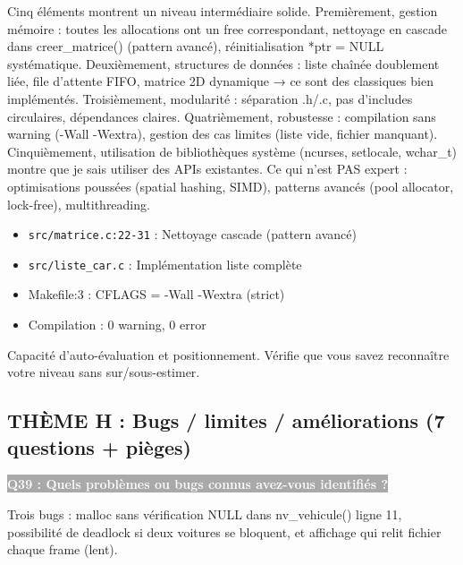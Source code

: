 \documentclass[12pt,a4paper]{article}
\newcommand{\question}[1]{%
    \vspace{0.5cm}
    \noindent\colorbox{darkgray}{\textcolor{white}{\textbf{#1}}}
    \vspace{0.3cm}
}
\begin{document}
\begin{reponse_longue}
Cinq éléments montrent un niveau intermédiaire solide. Premièrement, gestion mémoire : toutes les allocations ont un free correspondant, nettoyage en cascade dans creer\_matrice() (pattern avancé), réinitialisation *ptr = NULL systématique. Deuxièmement, structures de données : liste chaînée doublement liée, file d'attente FIFO, matrice 2D dynamique → ce sont des classiques bien implémentés. Troisièmement, modularité : séparation .h/.c, pas d'includes circulaires, dépendances claires. Quatrièmement, robustesse : compilation sans warning (-Wall -Wextra), gestion des cas limites (liste vide, fichier manquant). Cinquièmement, utilisation de bibliothèques système (ncurses, setlocale, wchar\_t) montre que je sais utiliser des APIs existantes. Ce qui n'est PAS expert : optimisations poussées (spatial hashing, SIMD), patterns avancés (pool allocator, lock-free), multithreading.
\end{reponse_longue}

\begin{reference_code}
\begin{itemize}
    \item \texttt{src/matrice.c:22-31} : Nettoyage cascade (pattern avancé)
    \item \texttt{src/liste\_car.c} : Implémentation liste complète
    \item Makefile:3 : CFLAGS = -Wall -Wextra (strict)
    \item Compilation : 0 warning, 0 error
\end{itemize}
\end{reference_code}

\begin{objectif_prof}
Capacité d'auto-évaluation et positionnement. Vérifie que vous savez reconnaître votre niveau sans sur/sous-estimer.
\end{objectif_prof}

\subsection{THÈME H : Bugs / limites / améliorations (7 questions + pièges)}

\question{Q39 : Quels problèmes ou bugs connus avez-vous identifiés ?}

\begin{reponse_courte}
Trois bugs : malloc sans vérification NULL dans nv\_vehicule() ligne 11, possibilité de deadlock si deux voitures se bloquent, et affichage qui relit fichier chaque frame (lent).
\end{reponse_courte}
\end{document}
